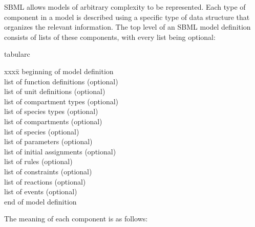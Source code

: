 SBML allows models of arbitrary complexity to be represented.
Each type of component in a model is described using a specific
type of data structure that organizes the relevant information.
The top level of an SBML model definition consists of lists of
these components, with every list being optional:
\begin{center}
  \slshape
  \begin{edtable}{tabular}{c}
    \begin{minipage}{3in}
      \begin{tabbing}
        xxxx\=\kill
        beginning of model definition\\[-1pt]
        \>list of function definitions (optional)\\[-1pt]
        \>list of unit definitions (optional)\\[-1pt]
        \>list of compartment types (optional)\\[-1pt]
        \>list of species types (optional)\\[-1pt]
        \>list of compartments (optional)\\[-1pt]
        \>list of species (optional)\\[-1pt]
        \>list of parameters (optional)\\[-1pt]
        \>list of initial assignments (optional)\\[-1pt]
        \>list of rules (optional)\\[-1pt]
        \>list of constraints (optional)\\[-1pt]
        \>list of reactions (optional)\\[-1pt]
        \>list of events (optional)\\[-1pt]
        end of model definition
      \end{tabbing}
    \end{minipage}
  \end{edtable}
\end{center}

The meaning of each component is as follows:


